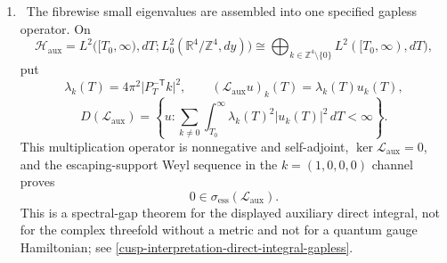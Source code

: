 \begin{enumerate}[leftmargin=1.8em]
\item \Verified\ The fibrewise small eigenvalues are assembled into one
specified gapless operator.  On
\[
 \mathscr H_{\mathrm{aux}}
 =L^2\bigl([T_0,\infty),dT;
 L^2_0(\mathbb R^4/\mathbb Z^4,dy)\bigr)
 \cong\bigoplus_{k\in\mathbb Z^4\setminus\{0\}}
 L^2([T_0,\infty),dT),
\]
put
\[
 \lambda_k(T)=4\pi^2\lvert P_T^{-\mathsf T}k\rvert^2,\qquad
 (\mathscr L_{\mathrm{aux}}u)_k(T)=\lambda_k(T)u_k(T),
\]
\[
 D(\mathscr L_{\mathrm{aux}})=\left\{u:
 \sum_{k\ne0}\int_{T_0}^{\infty}
 \lambda_k(T)^2\lvert u_k(T)\rvert^2\,dT<\infty\right\}.
\]
This multiplication operator is nonnegative and self-adjoint,
\(\ker\mathscr L_{\mathrm{aux}}=0\), and the escaping-support Weyl
sequence in the \(k=(1,0,0,0)\) channel proves
\[
 0\in\sigma_{\mathrm{ess}}(\mathscr L_{\mathrm{aux}}).
\]
This is a spectral-gap theorem for the displayed auxiliary direct integral,
not for the complex threefold without a metric and not for a quantum gauge
Hamiltonian; see \cref{cusp-interpretation-direct-integral-gapless}.


\end{enumerate}
